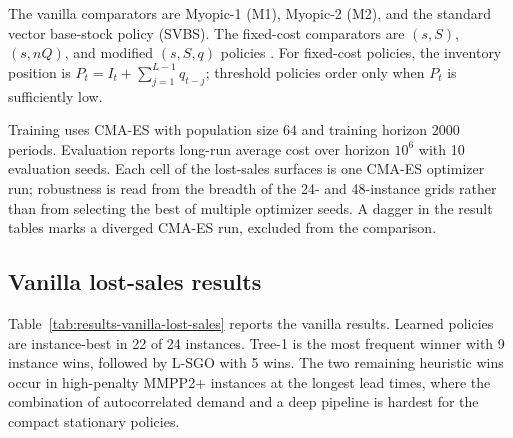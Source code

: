 \documentclass[authoryear,11pt]{elsarticle}
\begin{document}
The vanilla comparators are Myopic-1 (M1), Myopic-2 (M2), and the standard vector base-stock policy (SVBS). The fixed-cost comparators are $(s,S)$, $(s,nQ)$, and modified $(s,S,q)$ policies \citep{Bijvank2015ParametricPolicies}. For fixed-cost policies, the inventory position is $P_t=I_t+\sum_{j=1}^{L-1}q_{t-j}$; threshold policies order only when $P_t$ is sufficiently low.

Training uses CMA-ES with population size $64$ and training horizon $2000$ periods. Evaluation reports long-run average cost over horizon $10^6$ with 10 evaluation seeds. Each cell of the lost-sales surfaces is one CMA-ES optimizer run; robustness is read from the breadth of the 24- and 48-instance grids rather than from selecting the best of multiple optimizer seeds. A dagger in the result tables marks a diverged CMA-ES run, excluded from the comparison.

\subsection{Vanilla lost-sales results}

Table~\ref{tab:results-vanilla-lost-sales} reports the vanilla results. Learned policies are instance-best in 22 of 24 instances. Tree-1 is the most frequent winner with 9 instance wins, followed by L-SGO with 5 wins. The two remaining heuristic wins occur in high-penalty MMPP2$+$ instances at the longest lead times, where the combination of autocorrelated demand and a deep pipeline is hardest for the compact stationary policies.
\end{document}
